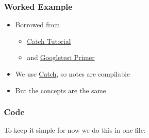 \subsubsection{Worked Example}\label{worked-example}

\begin{itemize}
\itemsep1pt\parskip0pt
\item
  Borrowed from

  \begin{itemize}
  \itemsep1pt\parskip0pt
  \item
    \href{https://github.com/philsquared/Catch/blob/master/docs/tutorial.md}{Catch
    Tutorial}
  \item
    and
    \href{https://code.google.com/p/googletest/wiki/V1_7_Primer}{Googletest
    Primer}
  \end{itemize}
\item
  We use \href{https://github.com/philsquared/Catch}{Catch}, so notes
  are compilable
\item
  But the concepts are the same
\end{itemize}

\subsubsection{Code}\label{code}

To keep it simple for now we do this in one file:

\begin{Shaded}
\begin{Highlighting}[]

    
      
\NormalTok{\}}

\NormalTok{, } \NormalTok{) \{}
    \NormalTok{) == } \NormalTok{);}
    \NormalTok{) == } \NormalTok{);}
    \NormalTok{) == } \NormalTok{);}
    \NormalTok{) == } \NormalTok{);}
\NormalTok{\}}
\end{Highlighting}
\end{Shaded}

